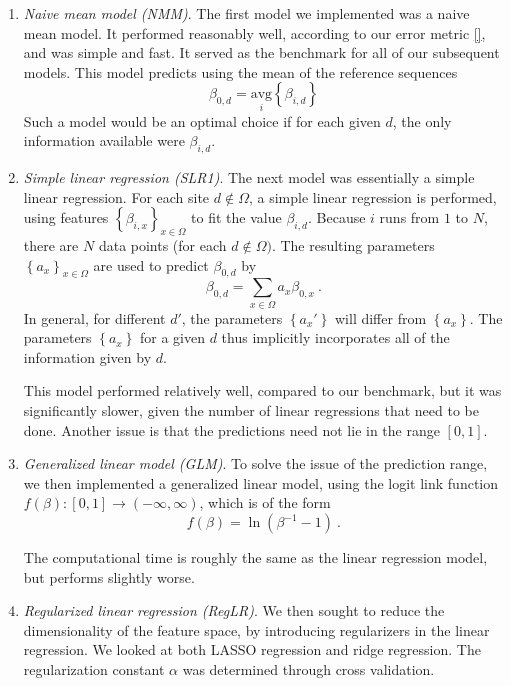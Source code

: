 \documentclass{article} %
\begin{document}
\begin{enumerate}
\item \emph{Naive mean model (NMM)}. The first model we implemented was a naive mean model. It performed reasonably well, according to our error metric \ref{}, and was simple and fast. It served as the benchmark for all of our subsequent models. This model predicts using the mean of the reference sequences
\[ \beta_{0,d} = \underset{i}{\text{avg}} \left\{ \beta_{i,d}\right\}\]
Such a model would be an optimal choice if for each given $d$, the only information available were $\beta_{i,d}$.

\item \emph{Simple linear regression (SLR1)}. The next model was essentially a simple linear regression. For each site $d \notin \Omega$, a simple linear regression is performed, using features $\left\{ \beta_{i,x} \right\}_{x \in \Omega}$ to fit the value $\beta_{i,d}$. Because $i$ runs from $1$ to $N$, there are $N$ data points (for each $d \notin \Omega)$. The resulting parameters $\left\{ a_x\right\}_{x \in \Omega}$ are used to predict $\beta_{0,d}$ by
\begin{equation} \label{beta.sites}\beta_{0,d} = \sum_{x \in \Omega} a_x \beta_{0,x} \ .\end{equation}
In general, for different $d'$, the parameters $\left\{a_x'\right\}$ will differ from $\left\{a_x\right\}$. The parameters $\left\{a_x\right\}$ for a given $d$ thus implicitly incorporates all of the information given by $d$.

This model performed relatively well, compared to our benchmark, but it was significantly slower, given the number of linear regressions that need to be done. Another issue is that the predictions need not lie in the range $[0,1]$.

\item \emph{Generalized linear model (GLM)}. To solve the issue of the prediction range, we then implemented a generalized linear model, using the logit link function $f(\beta): [0,1] \to (-\infty,\infty)$, which is of the form
\[ f(\beta) = \ln(\beta^{-1} - 1) \ .\]

The computational time is roughly the same as the linear regression model, but performs slightly worse.

\item \emph{Regularized linear regression (RegLR)}. We then sought to reduce the dimensionality of the feature space, by introducing regularizers in the linear regression. We looked at both LASSO regression and ridge regression. The regularization constant $\alpha$ was determined through cross validation.


\end{enumerate}
\end{document}
